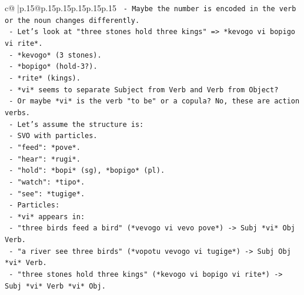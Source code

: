\documentclass{article}
\begin{document}
{\begin{supertabular}{c@{$\;$}|p{.15\linewidth}@{}p{.15\linewidth}p{.15\linewidth}p{.15\linewidth}p{.15\linewidth}p{.15\linewidth}}
{{{\texttt{                                     {-} Maybe the number is encoded in the verb or the noun changes differently.} \\
\texttt{                                     {-} Let's look at "three stones hold three kings" => *kevogo vi bopigo vi rite*.} \\
\texttt{                                       {-} *kevogo* (3 stones).} \\
\texttt{                                       {-} *bopigo* (hold{-}3?).} \\
\texttt{                                       {-} *rite* (kings).} \\
\texttt{                                       {-} *vi* seems to separate Subject from Verb and Verb from Object?} \\
\texttt{                                       {-} Or maybe *vi* is the verb "to be" or a copula? No, these are action verbs.} \\
\texttt{                                       {-} Let's assume the structure is:} \\
\texttt{                                         {-} SVO with particles.} \\
\texttt{                                         {-} "feed": *pove*.} \\
\texttt{                                         {-} "hear": *rugi*.} \\
\texttt{                                         {-} "hold": *bopi* (sg), *bopigo* (pl).} \\
\texttt{                                         {-} "watch": *tipo*.} \\
\texttt{                                         {-} "see": *tugige*.} \\
\texttt{                                       {-} Particles:} \\
\texttt{                                         {-} *vi* appears in:} \\
\texttt{                                           {-} "three birds feed a bird" (*vevogo vi vevo pove*) {-}> Subj *vi* Obj Verb.} \\
\texttt{                                           {-} "a river see three birds" (*vopotu vevogo vi tugige*) {-}> Subj Obj *vi* Verb.} \\
\texttt{                                           {-} "three stones hold three kings" (*kevogo vi bopigo vi rite*) {-}> Subj *vi* Verb *vi* Obj.} \\
}}}
\end{supertabular}}
\end{document}
